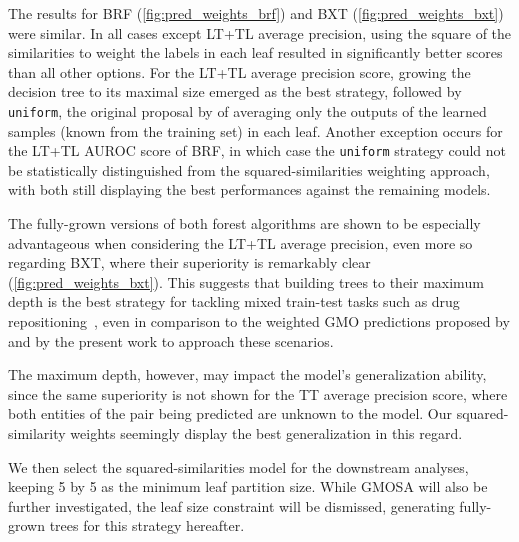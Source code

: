 The results for BRF (\autoref{fig:pred_weights_brf}) and BXT (\autoref{fig:pred_weights_bxt}) were similar. In all cases except LT+TL average precision, using the square of the similarities to weight the labels in each leaf resulted in significantly better scores than all other options. For the LT+TL average precision score, growing the decision tree to its maximal size emerged as the best strategy, followed by \texttt{uniform}, the original proposal by \textcite{pliakos2018global} of averaging only the 
outputs of the learned samples (known from the training set) in each leaf. Another exception occurs for the LT+TL AUROC score of BRF, in which case the \texttt{uniform} strategy could not be statistically distinguished from the squared-similarities weighting approach, with both still displaying the best performances against the remaining models.

The fully-grown versions of both forest algorithms are shown to be especially advantageous when considering the LT+TL average precision, even more so regarding BXT, where their superiority is remarkably clear (\autoref{fig:pred_weights_bxt}). This suggests that building trees to their maximum depth is the best strategy for tackling mixed train-test tasks such as drug repositioning~\cite{}, even in comparison to the weighted GMO predictions proposed by \textcite{pliakos2018global} and by the present work to approach these scenarios. 

The maximum depth, however, may impact the model's generalization ability, since the same superiority is not shown for the TT average precision score, where both entities of the pair being predicted are unknown to the model. Our squared-similarity weights seemingly display the best generalization in this regard.


We then select the squared-similarities model for the downstream analyses, keeping 5 by 5 as the minimum leaf partition size. While GMOSA will also be further investigated, the leaf size constraint will be dismissed, generating fully-grown trees for this strategy hereafter.

